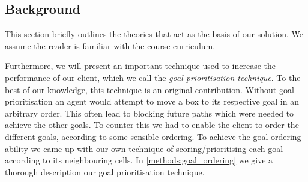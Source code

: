 \subsection{Background}
\label{sec:background}


This section briefly outlines the theories that act as the basis of our solution. 
We assume the reader is familiar with the course curriculum.



Furthermore, we will present an important technique used to increase the performance of our client, which we call the \emph{goal prioritisation technique}.
To the best of our knowledge, this technique is an original contribution.
Without goal prioritisation an agent would attempt to move a box to its respective goal in an arbitrary order.
This often lead to blocking future paths which were needed to achieve the other goals.
To counter this we had to enable the client to order the different goals, according to some sensible ordering.
To achieve the goal ordering ability we came up with our own technique of scoring/prioritising each goal according to its neighbouring cells.
In \cref{methods:goal_ordering} we give a thorough description our goal prioritisation technique.
